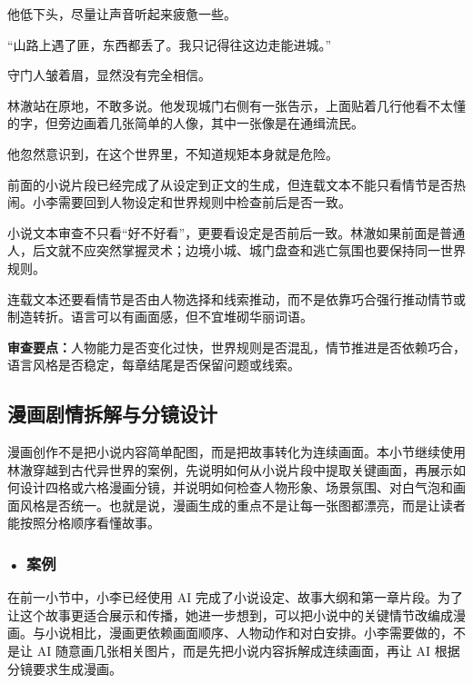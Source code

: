 \begin{aibox}
\hspace*{2em}他低下头，尽量让声音听起来疲惫一些。

\hspace*{2em}``山路上遇了匪，东西都丢了。我只记得往这边走能进城。''

\hspace*{2em}守门人皱着眉，显然没有完全相信。

\hspace*{2em}林澈站在原地，不敢多说。他发现城门右侧有一张告示，上面贴着几行他看不太懂的字，但旁边画着几张简单的人像，其中一张像是在通缉流民。

\hspace*{2em}他忽然意识到，在这个世界里，不知道规矩本身就是危险。
\end{aibox}

前面的小说片段已经完成了从设定到正文的生成，但连载文本不能只看情节是否热闹。小李需要回到人物设定和世界规则中检查前后是否一致。

\begin{critiquebox}
小说文本审查不只看“好不好看”，更要看设定是否前后一致。林澈如果前面是普通人，后文就不应突然掌握灵术；边境小城、城门盘查和逃亡氛围也要保持同一世界规则。

连载文本还要看情节是否由人物选择和线索推动，而不是依靠巧合强行推动情节或制造转折。语言可以有画面感，但不宜堆砌华丽词语。

\textbf{审查要点：}人物能力是否变化过快，世界规则是否混乱，情节推进是否依赖巧合，语言风格是否稳定，每章结尾是否保留问题或线索。
\end{critiquebox}


\subsection{漫画剧情拆解与分镜设计}

漫画创作不是把小说内容简单配图，而是把故事转化为连续画面。本小节继续使用林澈穿越到古代异世界的案例，先说明如何从小说片段中提取关键画面，再展示如何设计四格或六格漫画分镜，并说明如何检查人物形象、场景氛围、对白气泡和画面风格是否统一。也就是说，漫画生成的重点不是让每一张图都漂亮，而是让读者能按照分格顺序看懂故事。

\subsubsection*{\textbf{• 案例}}

在前一小节中，小李已经使用 AI 完成了小说设定、故事大纲和第一章片段。为了让这个故事更适合展示和传播，她进一步想到，可以把小说中的关键情节改编成漫画。与小说相比，漫画更依赖画面顺序、人物动作和对白安排。小李需要做的，不是让 AI 随意画几张相关图片，而是先把小说内容拆解成连续画面，再让 AI 根据分镜要求生成漫画。

